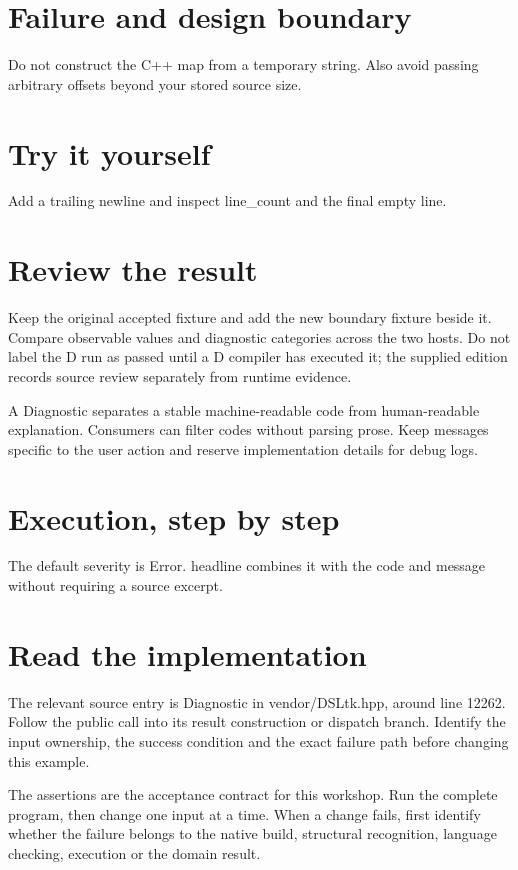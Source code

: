 
\section*{Failure and design boundary}
Do not construct the C++ map from a temporary string. Also avoid passing arbitrary offsets beyond your stored source size.

\section*{Try it yourself}
Add a trailing newline and inspect line\_count and the final empty line.

\section*{Review the result}
Keep the original accepted fixture and add the new boundary fixture beside it. Compare observable values and diagnostic categories across the two hosts. Do not label the D run as passed until a D compiler has executed it; the supplied edition records source review separately from runtime evidence.

\clearpage
{}
A Diagnostic separates a stable machine-readable code from human-readable explanation. Consumers can filter codes without parsing prose. Keep messages specific to the user action and reserve implementation details for debug logs.


\section*{Execution, step by step}
The default severity is Error. headline combines it with the code and message without requiring a source excerpt.

\section*{Read the implementation}
The relevant source entry is Diagnostic in vendor/DSLtk.hpp, around line 12262. Follow the public call into its result construction or dispatch branch. Identify the input ownership, the success condition and the exact failure path before changing this example.

The assertions are the acceptance contract for this workshop. Run the complete program, then change one input at a time. When a change fails, first identify whether the failure belongs to the native build, structural recognition, language checking, execution or the domain result.

